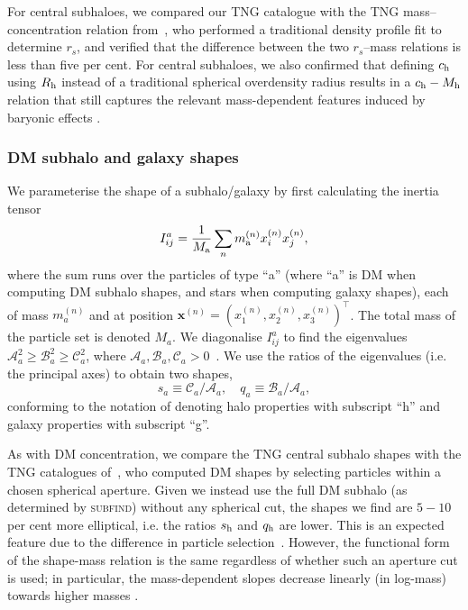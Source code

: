 \documentclass[usenatbib,useAMS]{mnras}
\begin{document}
For central subhaloes, we compared our TNG catalogue with the TNG mass--concentration relation from~\citet*{Anbajagane_2022}, who performed a traditional density profile fit to determine $r_s$, and verified that the difference between the two $r_s$--mass relations is less than five per cent. For central subhaloes, we also confirmed that defining $c_{\rm h}$ using $R_{\rm h}$ instead of a traditional spherical overdensity radius results in a $c_{\rm h} - M_{\rm h}$ relation that still captures the relevant mass-dependent features induced by baryonic effects \citep*[see ``wiggle'' features in][Figure 3]{Anbajagane_2022}.

\subsubsection{\Acl{DM} subhalo and galaxy shapes}

We parameterise the shape of a subhalo/galaxy by first calculating the inertia tensor
\begin{equation}
    \label{eq:inertia tensor}
    I^a_{ij} = \frac{1}{M_{\rm a}} \sum_n m_{\rm a}^{\left( n \right)} x_i^{\left( n \right)}x_j^{\left( n \right)},
\end{equation}
where the sum runs over the particles of type ``a'' (where ``a'' is \ac{DM} when computing \ac{DM} subhalo shapes, and stars when computing galaxy shapes), each of mass $m_a^{\left( n \right)}$ and at position $\bm{x}^{\left( n \right)} = \left(x^{\left(n\right)}_1, x^{\left( n \right)}_2, x^{\left( n \right)}_3 \right)^\intercal$. The total mass of the particle set is denoted $M_a$. We diagonalise $I^a_{ij}$ to find the eigenvalues $\mathcal{A}_a^2 \geq \mathcal{B}_a^2 \geq \mathcal{C}_a^2$, where $\mathcal{A}_a,\mathcal{B}_a,\mathcal{C}_a > 0$~\citep{Chisari_2015}. We use the ratios of the eigenvalues (i.e. the principal axes) to obtain two shapes,
% 
\begin{equation}
    s_a \equiv \mathcal{C}_a/\mathcal{A}_a, \quad q_a \equiv \mathcal{B}_a/\mathcal{A}_a,
\end{equation}
% 
conforming to the notation of denoting halo properties with subscript ``h'' and galaxy properties with subscript ``g''.

As with \ac{DM} concentration, we compare the TNG central subhalo shapes with the TNG catalogues of~\citet*{Anbajagane_2022}, who computed \ac{DM} shapes by selecting particles within a chosen spherical aperture. Given we instead use the full \ac{DM} subhalo (as determined by \textsc{subfind}) without any spherical cut, the shapes we find are $5-10$ per cent more elliptical, i.e. the ratios $s_{\rm h}$ and $q_{\rm h}$ are lower. This is an expected feature due to the difference in particle selection~\citep{Zemp2011Shapes}. However, the functional form of the shape-mass relation is the
same regardless of whether such an aperture cut is used; in particular, the mass-dependent slopes decrease linearly (in log-mass) towards higher masses \citep*[see][Figure 5]{Anbajagane_2022}.
\end{document}

